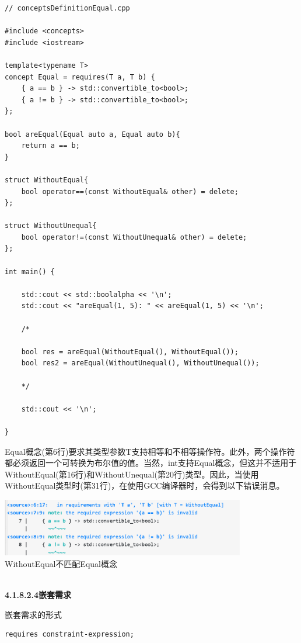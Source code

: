 \begin{lstlisting}[style=styleCXX]
// conceptsDefinitionEqual.cpp

#include <concepts>
#include <iostream>

template<typename T>
concept Equal = requires(T a, T b) {
	{ a == b } -> std::convertible_to<bool>;
	{ a != b } -> std::convertible_to<bool>;
};

bool areEqual(Equal auto a, Equal auto b){
	return a == b;
}

struct WithoutEqual{
	bool operator==(const WithoutEqual& other) = delete;
};

struct WithoutUnequal{
	bool operator!=(const WithoutUnequal& other) = delete;
};

int main() {

	std::cout << std::boolalpha << '\n';
	std::cout << "areEqual(1, 5): " << areEqual(1, 5) << '\n';

	/*

	bool res = areEqual(WithoutEqual(), WithoutEqual());
	bool res2 = areEqual(WithoutUnequal(), WithoutUnequal());

	*/

	std::cout << '\n';

}
\end{lstlisting}

Equal概念(第6行)要求其类型参数T支持相等和不相等操作符。此外，两个操作符都必须返回一个可转换为布尔值的值。当然，int支持Equal概念，但这并不适用于WithoutEqual(第16行)和WithoutUnequal(第20行)类型。因此，当使用WithoutEqual类型时(第31行)，在使用GCC编译器时，会得到以下错误消息。

\begin{center}
\includegraphics[width=0.8\textwidth]{content/3/chapter4/images/1-4.png}\\
WithoutEqual不匹配Equal概念
\end{center}

\hspace*{\fill} \\ %
\noindent
\textbf{4.1.8.2.4\hspace{0.2cm}嵌套需求}

嵌套需求的形式

\begin{lstlisting}[style=styleCXX]
requires constraint-expression;
\end{lstlisting}

